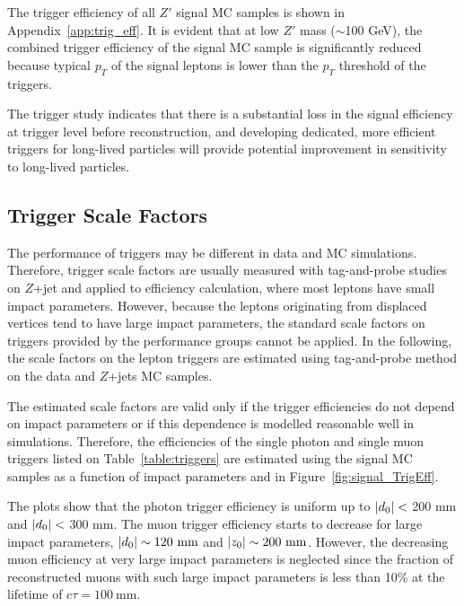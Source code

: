 The trigger efficiency of all $Z'$ signal MC samples is shown in Appendix~\ref{app:trig_eff}. It is evident that at low $Z'$ mass ($\sim$100 GeV), the combined trigger efficiency of the signal MC sample is significantly reduced because typical $p_{T}$ of the signal leptons is lower than the $p_{T}$ threshold of the triggers.

The trigger study indicates that there is a substantial loss in the signal efficiency at trigger level before reconstruction, and developing dedicated, more efficient triggers for long-lived particles will provide potential improvement in sensitivity to long-lived particles. 


\subsection{Trigger Scale Factors}
\label{sec:syst:trigger}

The performance of triggers may be different in data and MC simulations. Therefore, trigger scale factors are usually measured with tag-and-probe studies on $Z$+jet and applied to efficiency calculation, where most leptons have small impact parameters. However, because the leptons originating from displaced vertices tend to have large impact parameters, the standard scale factors on triggers provided by the performance groups cannot be applied. In the following, the scale factors on the lepton triggers are estimated using tag-and-probe method on the data and $Z$+jets MC samples. 

The estimated scale factors are valid only if the trigger efficiencies do not depend on impact parameters or if this dependence is modelled reasonable well in simulations. Therefore, the efficiencies of the single photon and single muon triggers listed on Table~\ref{table:triggers} are estimated using the signal MC samples as a function of impact parameters \dzero and \zzero in Figure~\ref{fig:signal_TrigEff}.

The plots show that the photon trigger efficiency is uniform up to $|d_{0}| <$ 200 mm and $|d_{0}| <$ 300 mm. The muon trigger efficiency starts to decrease for large impact parameters, $|\dzero| \sim120~\si{\mm}$ and $|\zzero| \sim200~\si{\mm}$. However, the decreasing muon efficiency at very large impact parameters is neglected since the fraction of reconstructed muons with such large impact parameters is less than 10\% at the lifetime of $c\tau=100~\si{\mm}$.


